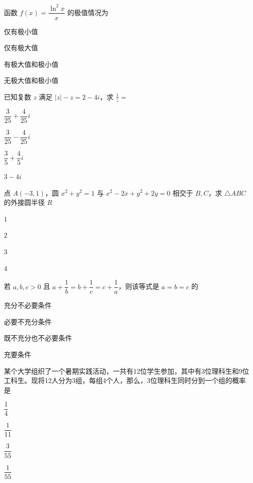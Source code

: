 \documentclass{exam-zh}
\begin{document}
\begin{question}
函数 $f(x)=\dfrac{\ln^2 x}{x}$ 的极值情况为 \paren[]
\begin{choices}
  \item 仅有极小值
  \item 仅有极大值
  \item 有极大值和极小值
  \item 无极大值和极小值
\end{choices}
\end{question}

\begin{question}
已知复数 $z$ 满足 $|z|-z=2-4i$，求 $\frac{1}{z}=$ \paren[]
\begin{choices}
  \item $\dfrac{3}{25}+\dfrac{4}{25}i$
  \item $\dfrac{3}{25}-\dfrac{4}{25}i$
  \item $\dfrac{3}{5}+\dfrac{4}{5}i$
  \item $3-4i$
\end{choices}
\end{question}

\begin{question}
点 $A(-3,1)$，圆 $x^2+y^2=1$ 与 $x^2-2x+y^2+2y=0$ 相交于 $B,C$，求 $\triangle ABC$ 的外接圆半径 $R$ \paren[]
\begin{choices}
  \item $1$
  \item $2$
  \item $3$
  \item $4$
\end{choices}
\end{question}

\begin{question}
若 $a,b,c>0$ 且 $a+\dfrac{1}{b}=b+\dfrac{1}{c}=c+\dfrac{1}{a}$，则该等式是 $a=b=c$ 的 \paren[]
\begin{choices}
  \item 充分不必要条件
  \item 必要不充分条件
  \item 既不充分也不必要条件
  \item 充要条件
\end{choices}
\end{question}

\begin{question}
某个大学组织了一个暑期实践活动，一共有12位学生参加，其中有3位理科生和9位工科生。现将12人分为3组，每组4个人，那么，3位理科生同时分到一个组的概率是 \paren[]
\begin{choices}
  \item $\dfrac{1}{4}$
  \item $\dfrac{1}{11}$
  \item $\dfrac{3}{55}$
  \item $\dfrac{1}{55}$
\end{choices}
\end{question}
\end{document}
